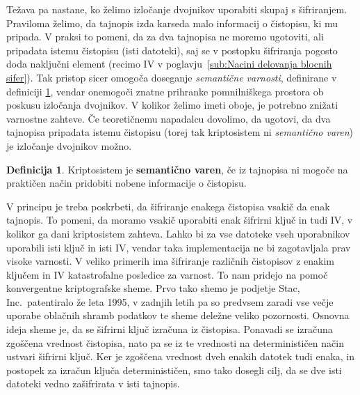 \documentclass[12pt,a4paper,openany,tikz]{book}
\theoremstyle{plain}
\theoremstyle{definition}
\newtheorem{defn}[thm]{Definicija} %
\begin{document}
Težava pa nastane, ko želimo izločanje dvojnikov uporabiti skupaj s šifriranjem. Praviloma želimo, da tajnopis izda karseda malo informacij o čistopisu, ki mu pripada. V praksi to pomeni, da za dva tajnopisa ne moremo ugotoviti, ali pripadata istemu čistopisu (isti datoteki), saj se v postopku šifriranja pogosto doda naključni element (recimo \gls{IV} v poglavju~\ref{sub:Nacini delovanja blocnih sifer}). Tak pristop sicer omogoča doseganje \textit{semantične varnosti}, definirane v definiciji \ref{def:semsec}, vendar onemogoči znatne prihranke pomnilniškega prostora ob poskusu izločanja dvojnikov. V kolikor želimo imeti oboje, je potrebno znižati varnostne zahteve. Če teoretičnemu napadalcu dovolimo, da ugotovi, da dva tajnopisa pripadata istemu čistopisu (torej tak kriptosistem ni \textit{semantično varen}) je izločanje dvojnikov možno.

\begin{mdframed}
  \begin{defn}
    Kriptosistem je \textbf{semantično varen}, če iz tajnopisa ni mogoče na praktičen način pridobiti nobene informacije o čistopisu.
    \label{def:semsec}
  \end{defn}
\end{mdframed}

V principu je treba poskrbeti, da šifriranje enakega čistopisa vsakič da enak tajnopis. To pomeni, da moramo vsakič uporabiti enak šifrirni ključ in tudi \gls{IV}, v kolikor ga dani kriptosistem zahteva. Lahko bi za vse datoteke vseh uporabnikov uporabili isti ključ in isti \gls{IV}, vendar taka implementacija ne bi zagotavljala prav visoke varnosti. V veliko primerih ima šifriranje različnih čistopisov z enakim ključem in IV katastrofalne posledice za varnost. To nam pridejo na pomoč konvergentne kriptografske sheme. Prvo tako shemo je podjetje Stac, Inc.\ patentiralo že leta 1995, v zadnjih letih pa so predvsem zaradi vse večje uporabe oblačnih shramb podatkov te sheme deležne veliko pozornosti. Osnovna ideja sheme je, da se šifrirni ključ izračuna iz čistopisa. Ponavadi se izračuna zgoščena vrednost čistopisa, nato pa se iz te vrednosti na determinističen način ustvari šifrirni ključ. Ker je zgoščena vrednost dveh enakih datotek tudi enaka, in postopek za izračun ključa determinističen, smo tako dosegli cilj, da se dve isti datoteki vedno zašifrirata v isti tajnopis.
\end{document}
